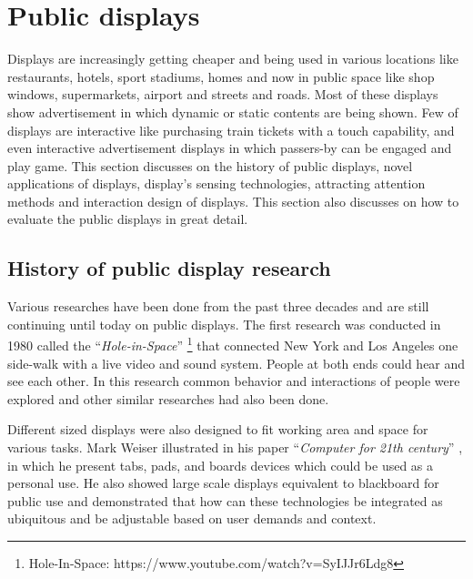 \section{Public displays}
Displays are increasingly getting cheaper and being used in various locations like restaurants, hotels, sport stadiums, homes and now in public space like shop windows, supermarkets, airport and streets and roads. Most of these displays show advertisement in which dynamic or static contents are being shown. Few of displays are interactive like purchasing train tickets with a touch capability, and even interactive advertisement displays in which passers-by can be engaged and play game. 
This section discusses on the history of public displays, novel applications of displays, display’s sensing technologies, attracting attention methods and interaction design of displays. This section also discusses on how to evaluate the public displays in great detail. 





\subsection{History of public display research}
Various researches have been done from the past three decades and are still continuing until today on public displays. The first research was conducted in 1980 called the ``\emph{Hole-in-Space}'' \footnote{Hole-In-Space: https://www.youtube.com/watch?v=SyIJJr6Ldg8} that connected New York and Los Angeles one side-walk with a live video and sound system. People at both ends could hear and see each other. In this research common behavior and interactions of people were explored and other similar researches had also been done.

Different sized displays were also designed to fit working area and space for various tasks. Mark Weiser illustrated in his paper ``\emph{Computer for 21th century}'' \cite{newgenerationcomputer}, in which he present tabs, pads, and boards devices which could be used as a personal use. He also showed large scale displays equivalent to blackboard for public use and demonstrated that how can these technologies be integrated as ubiquitous and be adjustable based on user demands and context. 

